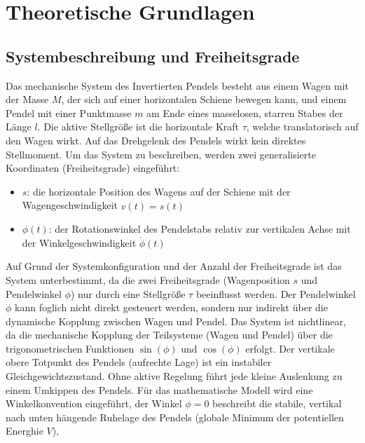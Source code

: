 \chapter{Theoretische Grundlagen}
\label{ch:grundlagen}

\section{Systembeschreibung und Freiheitsgrade}
Das mechanische System des Invertierten Pendels besteht aus einem Wagen mit der Masse $M$, der sich auf einer horizontalen Schiene bewegen kann, 
und einem Pendel mit einer Punktmasse $m$ am Ende eines masselosen, starren Stabes der Länge $l$. 
Die aktive Stellgröße ist die horizontale Kraft $\tau$, welche translatorisch auf den Wagen wirkt.
Auf das Drehgelenk des Pendels wirkt kein direktes Stellmoment. 
Um das System zu beschreiben, werden zwei generalisierte Koordinaten (Freiheitsgrade) eingeführt:
\begin{itemize}
    \item $s$: die horizontale Position des Wagens auf der Schiene mit der Wagengeschwindigkeit $v(t) = \dot{s(t)}$
    \item $\phi(t)$: der Rotationswinkel des Pendelstabs relativ zur vertikalen Achse mit der Winkelgeschwindigkeit $\dot{\phi}(t)$
\end{itemize} 
Auf Grund der Systemkonfiguration und der Anzahl der Freiheitsgrade ist das System unterbestimmt, da die zwei Freiheitsgrade (Wagenposition $s$ und Pendelwinkel $\phi$) nur durch eine Stellgröße $\tau$ beeinflusst werden.
Der Pendelwinkel $\phi$ kann foglich nicht direkt gesteuert werden, sondern nur indirekt über die dynamische Kopplung zwischen Wagen und Pendel.
Das System ist nichtlinear, da die mechanische Kopplung der Teilsysteme (Wagen und Pendel) über die trigonometrischen Funktionen $\sin(\phi)$ und $\cos(\phi)$ erfolgt.
Der vertikale obere Totpunkt des Pendels (aufrechte Lage) ist ein instabiler Gleichgewichtszustand. Ohne aktive Regelung führt jede kleine Auslenkung zu einem Umkippen des Pendels.
Für das mathematische Modell wird eine Winkelkonvention eingeführt, der Winkel $\phi = 0$ beschreibt die stabile, vertikal nach unten hängende Ruhelage des Pendels (globale Minimum der potentiellen Energhie $V$), 
